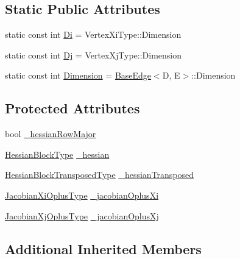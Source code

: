 \subsection*{Static Public Attributes}
\begin{DoxyCompactItemize}
\item 
static const int \hyperlink{classg2o_1_1BaseBinaryEdge_abfe232196405a7204bc299a747c1cc8b}{Di} = Vertex\+Xi\+Type\+::\+Dimension
\item 
static const int \hyperlink{classg2o_1_1BaseBinaryEdge_ab718b94950a34d589371fe6f5583b259}{Dj} = Vertex\+Xj\+Type\+::\+Dimension
\item 
static const int \hyperlink{classg2o_1_1BaseBinaryEdge_af3c134948e48c446762fa4e427d1cca5}{Dimension} = \hyperlink{classg2o_1_1BaseEdge}{Base\+Edge}$<$D, E$>$\+::Dimension
\end{DoxyCompactItemize}
\subsection*{Protected Attributes}
\begin{DoxyCompactItemize}
\item 
bool \hyperlink{classg2o_1_1BaseBinaryEdge_aeb5c1f09a4433a6bd76ce4ab67bd9a64}{\+\_\+hessian\+Row\+Major}
\item 
\hyperlink{classg2o_1_1BaseBinaryEdge_a7eadbbe6abffe4d2ebdf6231272789a5}{Hessian\+Block\+Type} \hyperlink{classg2o_1_1BaseBinaryEdge_a5036f75e3b20c79cb014fcc929d8eef9}{\+\_\+hessian}
\item 
\hyperlink{classg2o_1_1BaseBinaryEdge_aec0d5b1819f702b7658574fcd6324b49}{Hessian\+Block\+Transposed\+Type} \hyperlink{classg2o_1_1BaseBinaryEdge_aa61657904b00fcfa19df382094386f11}{\+\_\+hessian\+Transposed}
\item 
\hyperlink{classg2o_1_1BaseBinaryEdge_ab1cde84224b129603bcd95db027e0167}{Jacobian\+Xi\+Oplus\+Type} \hyperlink{classg2o_1_1BaseBinaryEdge_aa21b9d84924ec93192374761ee0adfa7}{\+\_\+jacobian\+Oplus\+Xi}
\item 
\hyperlink{classg2o_1_1BaseBinaryEdge_a83e5dec2135b33e86255c87be3b5d062}{Jacobian\+Xj\+Oplus\+Type} \hyperlink{classg2o_1_1BaseBinaryEdge_ad448518247044496cb99c9d70bd1a363}{\+\_\+jacobian\+Oplus\+Xj}
\end{DoxyCompactItemize}
\subsection*{Additional Inherited Members}


